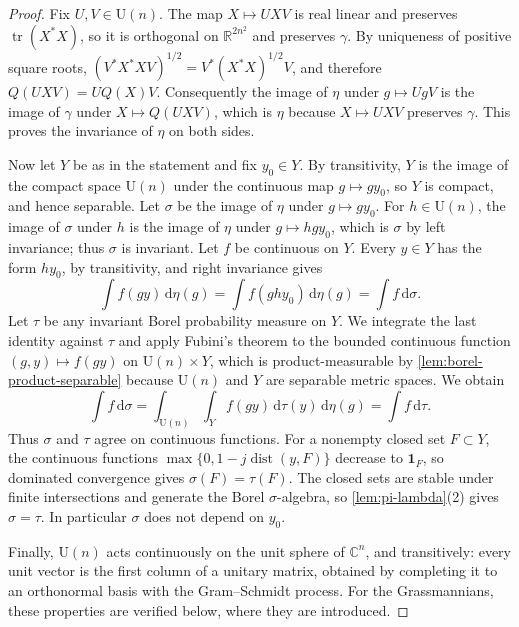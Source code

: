 \begin{proof}
Fix $U,V\in\mathrm U(n)$. The map $X\mapsto UXV$ is real linear and preserves $\operatorname{tr}(X^*X)$, so it is orthogonal on $\mathbb R^{2n^2}$ and preserves $\gamma$. By uniqueness of positive square roots, $(V^*X^*XV)^{1/2}=V^*(X^*X)^{1/2}V$, and therefore $Q(UXV)=UQ(X)V$. Consequently the image of $\eta$ under $g\mapsto UgV$ is the image of $\gamma$ under $X\mapsto Q(UXV)$, which is $\eta$ because $X\mapsto UXV$ preserves $\gamma$. This proves the invariance of $\eta$ on both sides.

Now let $Y$ be as in the statement and fix $y_0\in Y$. By transitivity, $Y$ is the image of the compact space $\mathrm U(n)$ under the continuous map $g\mapsto gy_0$, so $Y$ is compact, and hence separable. Let $\sigma$ be the image of $\eta$ under $g\mapsto gy_0$. For $h\in\mathrm U(n)$, the image of $\sigma$ under $h$ is the image of $\eta$ under $g\mapsto hgy_0$, which is $\sigma$ by left invariance; thus $\sigma$ is invariant. Let $f$ be continuous on $Y$. Every $y\in Y$ has the form $hy_0$, by transitivity, and right invariance gives
\[
 \int f(gy)\,\mathrm d\eta(g)=\int f(ghy_0)\,\mathrm d\eta(g)=\int f\,\mathrm d\sigma.
\]
Let $\tau$ be any invariant Borel probability measure on $Y$. We integrate the last identity against $\tau$ and apply Fubini's theorem to the bounded continuous function $(g,y)\mapsto f(gy)$ on $\mathrm U(n)\times Y$, which is product-measurable by \cref{lem:borel-product-separable} because $\mathrm U(n)$ and $Y$ are separable metric spaces. We obtain
\[
 \int f\,\mathrm d\sigma=\int_{\mathrm U(n)}\int_Yf(gy)\,\mathrm d\tau(y)\,\mathrm d\eta(g)=\int f\,\mathrm d\tau.
\]
Thus $\sigma$ and $\tau$ agree on continuous functions. For a nonempty closed set $F\subset Y$, the continuous functions $\max\{0,1-j\operatorname{dist}(y,F)\}$ decrease to $\mathbf1_F$, so dominated convergence gives $\sigma(F)=\tau(F)$. The closed sets are stable under finite intersections and generate the Borel $\sigma$-algebra, so \cref{lem:pi-lambda}(2) gives $\sigma=\tau$. In particular $\sigma$ does not depend on $y_0$.

Finally, $\mathrm U(n)$ acts continuously on the unit sphere of $\mathbb C^n$, and transitively: every unit vector is the first column of a unitary matrix, obtained by completing it to an orthonormal basis with the Gram--Schmidt process. For the Grassmannians, these properties are verified below, where they are introduced.
\end{proof}

